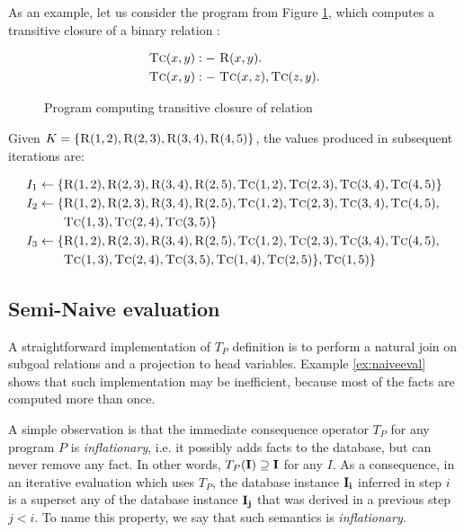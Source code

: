 \begin{exmp}
As an example, let us consider the program from Figure \ref{ex:tcofr}, which computes a transitive closure of a binary relation :
\begin{figure}[h!]
\begin{align*}
\textsc{Tc}(x, y) &:-~ \textsc{R}(x, y).\\
\textsc{Tc}(x, y) &:-~ \textsc{Tc}(x, z), \textsc{Tc}(z, y).
\end{align*}
\caption{Program computing transitive closure of relation \label{ex:tcofr}}
\end{figure}

Given $K = \{\textsc{R}(1, 2), \textsc{R}(2, 3), \textsc{R}(3, 4), \textsc{R}(4, 5)\}$, the values produced in subsequent iterations are:

\begin{align*}
I_1 \leftarrow \{&\textsc{R}(1, 2), \textsc{R}(2, 3), \textsc{R}(3, 4), \textsc{R}(2, 5), \textsc{Tc}(1, 2), \textsc{Tc}(2, 3), \textsc{Tc}(3, 4), \textsc{Tc}(4, 5)\}\\
I_2 \leftarrow \{&\textsc{R}(1, 2), \textsc{R}(2, 3), \textsc{R}(3, 4), \textsc{R}(2, 5), \textsc{Tc}(1, 2), \textsc{Tc}(2, 3), \textsc{Tc}(3, 4), \textsc{Tc}(4, 5), \\
&\textsc{Tc}(1, 3), \textsc{Tc}(2, 4), \textsc{Tc}(3, 5)\}\\
I_3 \leftarrow \{&\textsc{R}(1, 2), \textsc{R}(2, 3), \textsc{R}(3, 4), \textsc{R}(2, 5), \textsc{Tc}(1, 2), \textsc{Tc}(2, 3), \textsc{Tc}(3, 4), \textsc{Tc}(4, 5),\\
& \textsc{Tc}(1, 3), \textsc{Tc}(2, 4), \textsc{Tc}(3, 5), \textsc{Tc}(1, 4), \textsc{Tc}(2, 5)\}, \textsc{Tc}(1, 5)\}\\
\end{align*}
\label{ex:naiveeval}
\end{exmp}

\subsection{Semi-Naive evaluation}\label{ss:seminaiveevaldatalog}
A straightforward implementation of $T_P$ definition is to perform a natural join on subgoal relations and a projection to head variables. Example \ref{ex:naiveeval} shows that such implementation may be inefficient, because most of the facts are computed more than once.

A simple observation is that the immediate consequence operator $T_P$ for any program $P$ is \emph{inflationary}, i.e. it possibly adds facts to the database, but can never remove any fact. In other words, $T_P(\bf{I}) \supseteq \bf{I}$ for any $I$. As a consequence, in an iterative evaluation which uses $T_P$, the database instance $\bf{I}_i$ inferred in step $i$ is a superset any of the database instance $\bf{I}_j$ that was derived in a previous step $j < i$. To name this property, we say that such semantics is \emph{inflationary}.

